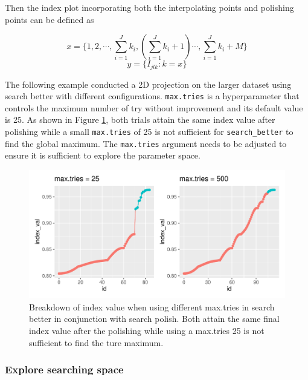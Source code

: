 \documentclass[12pt]{article}
\begin{document}
Then the index plot incorporating both the interpolating points and
polishing points can be defined as

\[x = \{1, 2, \cdots, \sum_{i = 1}^J k_i,(\sum_{i = 1}^J k_i + 1) \cdots,  \sum_{i = 1}^J k_i + M\}\]
\[y = \{I_{jlk}: k = x\}\]

The following example conducted a 2D projection on the larger dataset
using search better with different configurations. \texttt{max.tries} is
a hyperparameter that controls the maximum number of try without
improvement and its default value is 25. As shown in Figure
\ref{trace-compare}, both trials attain the same index value after
polishing while a small \texttt{max.tries} of 25 is not sufficient for
\texttt{search\_better} to find the global maximum. The
\texttt{max.tries} argument needs to be adjusted to ensure it is
sufficient to explore the parameter space.

\begin{figure}
\centering
\includegraphics{paper_files/figure-latex/polish-1.pdf}
\caption{\label{trace-compare}Breakdown of index value when using
different max.tries in search better in conjunction with search polish.
Both attain the same final index value after the polishing while using a
max.tries 25 is not sufficient to find the ture maximum.}
\end{figure}

\newpage

\hypertarget{animated}{%
\subsubsection{Explore searching space}\label{animated}}
\end{document}
